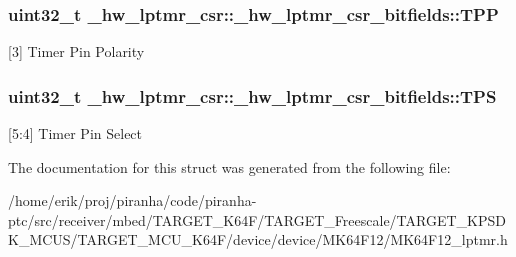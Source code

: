 \subsubsection[{\texorpdfstring{T\+PP}{TPP}}]{\setlength{\rightskip}{0pt plus 5cm}uint32\+\_\+t \+\_\+hw\+\_\+lptmr\+\_\+csr\+::\+\_\+hw\+\_\+lptmr\+\_\+csr\+\_\+bitfields\+::\+T\+PP}\hypertarget{struct__hw__lptmr__csr_1_1__hw__lptmr__csr__bitfields_ac836fbe76679c0618fc3572f65996b68}{}\label{struct__hw__lptmr__csr_1_1__hw__lptmr__csr__bitfields_ac836fbe76679c0618fc3572f65996b68}
\mbox{[}3\mbox{]} Timer Pin Polarity 
\subsubsection[{\texorpdfstring{T\+PS}{TPS}}]{\setlength{\rightskip}{0pt plus 5cm}uint32\+\_\+t \+\_\+hw\+\_\+lptmr\+\_\+csr\+::\+\_\+hw\+\_\+lptmr\+\_\+csr\+\_\+bitfields\+::\+T\+PS}\hypertarget{struct__hw__lptmr__csr_1_1__hw__lptmr__csr__bitfields_a2f00b1bd6d2cbdd98a67f03d42875306}{}\label{struct__hw__lptmr__csr_1_1__hw__lptmr__csr__bitfields_a2f00b1bd6d2cbdd98a67f03d42875306}
\mbox{[}5\+:4\mbox{]} Timer Pin Select 

The documentation for this struct was generated from the following file\+:\begin{DoxyCompactItemize}
\item 
/home/erik/proj/piranha/code/piranha-\/ptc/src/receiver/mbed/\+T\+A\+R\+G\+E\+T\+\_\+\+K64\+F/\+T\+A\+R\+G\+E\+T\+\_\+\+Freescale/\+T\+A\+R\+G\+E\+T\+\_\+\+K\+P\+S\+D\+K\+\_\+\+M\+C\+U\+S/\+T\+A\+R\+G\+E\+T\+\_\+\+M\+C\+U\+\_\+\+K64\+F/device/device/\+M\+K64\+F12/M\+K64\+F12\+\_\+lptmr.\+h\end{DoxyCompactItemize}
